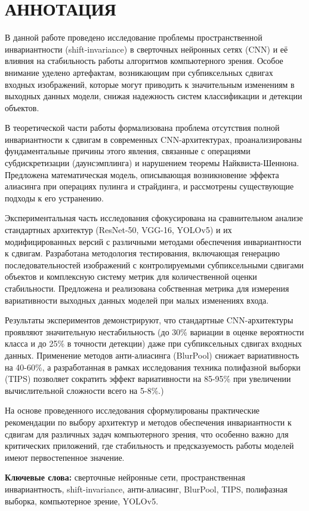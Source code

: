 \newpage
\section*{АННОТАЦИЯ}
\thispagestyle{empty}

В данной работе проведено исследование проблемы пространственной инвариантности (shift-invariance) в сверточных нейронных сетях (CNN) и её влияния на стабильность работы алгоритмов компьютерного зрения. Особое внимание уделено артефактам, возникающим при субпиксельных сдвигах входных изображений, которые могут приводить к значительным изменениям в выходных данных модели, снижая надежность систем классификации и детекции объектов.

В теоретической части работы формализована проблема отсутствия полной инвариантности к сдвигам в современных CNN-архитектурах, проанализированы фундаментальные причины этого явления, связанные с операциями субдискретизации (даунсэмплинга) и нарушением теоремы Найквиста-Шеннона. Предложена математическая модель, описывающая возникновение эффекта алиасинга при операциях пулинга и страйдинга, и рассмотрены существующие подходы к его устранению.

Экспериментальная часть исследования сфокусирована на сравнительном анализе стандартных архитектур (ResNet-50, VGG-16, YOLOv5) и их модифицированных версий с различными методами обеспечения инвариантности к сдвигам. Разработана методология тестирования, включающая генерацию последовательностей изображений с контролируемыми субпиксельными сдвигами объектов и комплексную систему метрик для количественной оценки стабильности. Предложена и реализована собственная метрика для измерения вариативности выходных данных моделей при малых изменениях входа.

Результаты экспериментов демонстрируют, что стандартные CNN-архитектуры проявляют значительную нестабильность (до 30\% вариации в оценке вероятности класса и до 25\% в точности детекции) даже при субпиксельных сдвигах входных данных. Применение методов анти-алиасинга (BlurPool) снижает вариативность на 40-60\%, а разработанная в рамках исследования техника полифазной выборки (TIPS) позволяет сократить эффект вариативности на 85-95\% при увеличении вычислительной сложности всего на 5-8\%.)

На основе проведенного исследования сформулированы практические рекомендации по выбору архитектур и методов обеспечения инвариантности к сдвигам для различных задач компьютерного зрения, что особенно важно для критических приложений, где стабильность и предсказуемость работы моделей имеют первостепенное значение.

\bigskip
\textbf{Ключевые слова:} сверточные нейронные сети, пространственная инвариантность, shift-invariance, анти-алиасинг, BlurPool, TIPS, полифазная выборка, компьютерное зрение, YOLOv5.

\newpage